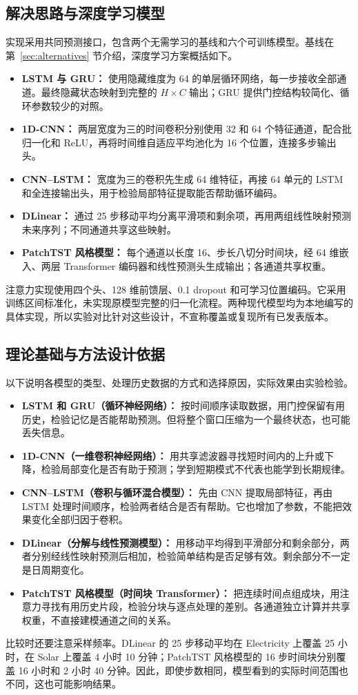\documentclass[12pt,a4paper,UTF8]{ctexart}
\begin{document}
\subsection{解决思路与深度学习模型}
实现采用共同预测接口，包含两个无需学习的基线和六个可训练模型。基线在第~\ref{sec:alternatives} 节介绍，深度学习方案概括如下。
\begin{itemize}
\item \textbf{LSTM 与 GRU：} 使用隐藏维度为 64 的单层循环网络，每一步接收全部通道。最终隐藏状态映射到完整的 $H\times C$ 输出；GRU 提供门控结构较简化、循环参数较少的对照。
\item \textbf{1D-CNN：} 两层宽度为三的时间卷积分别使用 32 和 64 个特征通道，配合批归一化和 ReLU，再将时间维自适应平均池化为 16 个位置，连接多步输出头。
\item \textbf{CNN--LSTM：} 宽度为三的卷积先生成 64 维特征，再接 64 单元的 LSTM 和全连接输出头，用于检验局部特征提取能否帮助循环编码。
\item \textbf{DLinear：} 通过 25 步移动平均分离平滑项和剩余项，再用两组线性映射预测未来序列；不同通道共享这些映射。
\item \textbf{PatchTST 风格模型：} 每个通道以长度 16、步长八切分时间块，经 64 维嵌入、两层 Transformer 编码器和线性预测头生成输出；各通道共享权重。
\end{itemize}
注意力实现使用四个头、128 维前馈层、0.1 dropout 和可学习位置编码。它采用训练区间标准化，未实现原模型完整的归一化流程。两种现代模型均为本地编写的具体实现，所以实验对比针对这些设计，不宣称覆盖或复现所有已发表版本。

\subsection{理论基础与方法设计依据}
以下说明各模型的类型、处理历史数据的方式和选择原因，实际效果由实验检验。
\begin{itemize}
\item \textbf{LSTM 和 GRU（循环神经网络）：} 按时间顺序读取数据，用门控保留有用历史，检验记忆是否能帮助预测。但将整个窗口压缩为一个最终状态，也可能丢失信息。
\item \textbf{1D-CNN（一维卷积神经网络）：} 用共享滤波器寻找短时间内的上升或下降，检验局部变化是否有助于预测；学到短期模式不代表也能学到长期规律。
\item \textbf{CNN--LSTM（卷积与循环混合模型）：} 先由 CNN 提取局部特征，再由 LSTM 处理时间顺序，检验两者结合是否有帮助。它也增加了参数，不能把效果变化全部归因于卷积。
\item \textbf{DLinear（分解与线性预测模型）：} 用移动平均得到平滑部分和剩余部分，两者分别经线性映射预测后相加，检验简单结构是否足够有效。剩余部分不一定是日周期变化。
\item \textbf{PatchTST 风格模型（时间块 Transformer）：} 把连续时间点组成块，用注意力寻找有用历史片段，检验分块与逐点处理的差别。各通道独立计算并共享权重，不直接建模通道之间的关系。
\end{itemize}
比较时还要注意采样频率。DLinear 的 25 步移动平均在 Electricity 上覆盖 25 小时，在 Solar 上覆盖 4 小时 10 分钟；PatchTST 风格模型的 16 步时间块分别覆盖 16 小时和 2 小时 40 分钟。因此，即使步数相同，模型看到的实际时间范围也不同，这也可能影响结果。
\end{document}
